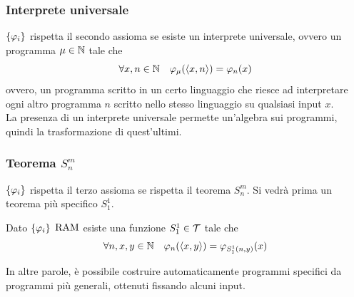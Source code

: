 \subsubsection{Interprete universale} 
$\{\varphi_i\}$ rispetta il secondo assioma se esiste un interprete universale, ovvero un programma $\mu \in \mathbb{N}$ tale che
$$ \forall x,n \in \mathbb{N} \quad \varphi_\mu (\langle x,n \rangle) = \varphi_n (x) $$
ovvero, un programma scritto in un certo linguaggio che riesce ad interpretare ogni altro programma $n$ scritto nello stesso linguaggio su qualsiasi input $x$.\\

La presenza di un interprete universale permette un'algebra sui programmi, quindi la trasformazione di quest'ultimi.\\

\subsubsection{Teorema $S_n^m$}
$\{\varphi_i\}$ rispetta il terzo assioma se rispetta il teorema $S_n^m$. Si vedrà prima un teorema più specifico $S_1^1$.\\

\begin{theor}[$S_1^1$]
	Dato $\{\varphi_i\}$ $\text{RAM}$ esiste una funzione $S_1^1 \in \mathcal{T}$ tale che 
	$$ \forall n,x,y \in \mathbb{N} \quad \varphi_n(\langle x,y \rangle) = \varphi_{S_1^1 (n,y)} (x) $$
\end{theor}

In altre parole, è possibile costruire automaticamente programmi specifici da programmi più generali, ottenuti fissando alcuni input.\\

